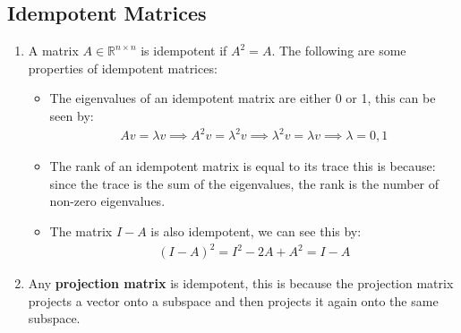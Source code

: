 \documentclass[letterpaper, 11pt]{article}
\newcommand{\R}{\mathbb{R}}	%
\newcommand{\1}{\mathds{1}}	%
\theoremstyle{definition}
\begin{document}
\subsection{Idempotent Matrices}
\begin{enumerate}
    \item A matrix $A \in \R^{n \times n}$ is idempotent if $A^2 = A$. The following are some properties of idempotent matrices:
    \begin{itemize}
        
        \item The eigenvalues of an idempotent matrix are either 0 or 1, this can be seen by:
        \begin{align}
            A v = \lambda v \implies A^2 v = \lambda^2 v \implies \lambda^2 v = \lambda v \implies \lambda = 0,1
        \end{align}
        \item The rank of an idempotent matrix is equal to its trace this is 
        because: since the trace is 
        the sum of the eigenvalues, the rank is the number of non-zero eigenvalues.
        \item The matrix $I - A$ is also idempotent, we can see this by:
        \begin{align}
            (I - A)^2 = I^2 - 2 A + A^2 = I - A
        \end{align}
    \end{itemize}
    \item Any \textbf{projection matrix} is idempotent, this is because the projection matrix projects a vector onto a subspace and then projects it again onto the same subspace.
\end{enumerate}
\end{document}
